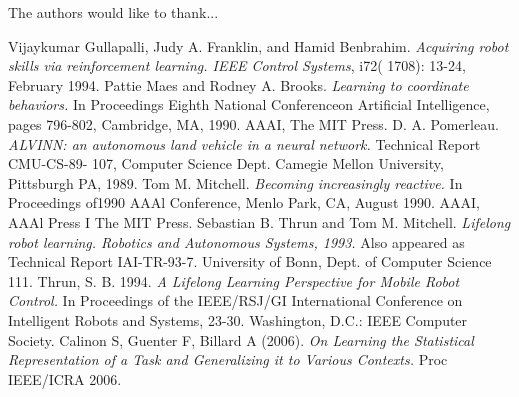 \documentclass[conference]{IEEEtran}
\begin{document}
The authors would like to thank...

\begin{thebibliography}{1}

Vijaykumar Gullapalli,  Judy A. Franklin, and Hamid Benbrahim.  \emph{Acquiring robot skills via reinforcement  learning. IEEE Control Systems}, i72(  1708):  13-24, February  1994. 
Pattie Maes and Rodney A. Brooks.  \emph{Learning to coordinate behaviors.} In Proceedings Eighth National Conferenceon Artificial Intelligence,  pages 796-802, Cambridge, MA, 1990.  AAAI, The MIT Press. 
D.  A. Pomerleau.  \emph{ALVINN: an  autonomous land vehicle  in  a neural network.}  Technical Report CMU-CS-89- 107, Computer Science Dept. Camegie Mellon University, Pittsburgh PA, 1989.
Tom M. Mitchell.  \emph{Becoming  increasingly reactive.}  In Proceedings of1990 AAAl Conference, Menlo Park, CA, August  1990.  AAAI, AAAl Press I The MIT Press. 
Sebastian B. Thrun and Tom M. Mitchell.  \emph{Lifelong robot learning. Robotics and Autonomous Systems, 1993.} Also appeared as Technical Report IAI-TR-93-7.  University of Bonn, Dept.  of Computer Science 111.
Thrun, S. B. 1994. \emph{A Lifelong Learning Perspective for Mobile Robot Control.} In Proceedings of the IEEE/RSJ/GI International Conference on Intelligent Robots and Systems, 23-30. Washington, D.C.: IEEE Computer Society.
Calinon S, Guenter F, Billard A (2006). \emph{On Learning the Statistical Representation of a Task and Generalizing it to Various Contexts.}  Proc IEEE/ICRA 2006.


\end{thebibliography}

\end{document}
